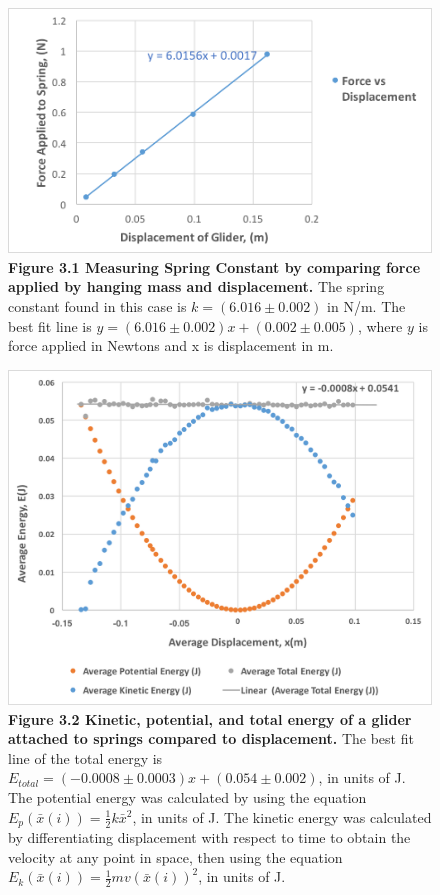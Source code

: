 \documentclass[11pt]{report}
\begin{document}
\begin{figure}[h!]
    \includegraphics[width=\linewidth]{SpringForce.png}
    \captionsetup{labelformat=empty}
    \caption{\textbf{Figure 3.1 Measuring Spring Constant by comparing force
    applied by hanging mass and displacement.} The spring constant found in this
case is \(k = (6.016 \pm 0.002)\) in N/m.  The best fit line is \(y = (6.016 \pm
0.002)x + (0.002 \pm 0.005)\), where \(y\) is force applied in Newtons and x is
displacement in m.}
\end{figure}

\begin{figure}[h!]
    \includegraphics[width=\linewidth]{Energy.png}
    \captionsetup[labelformat=empty]
    \caption{\textbf{Figure 3.2 Kinetic, potential, and total energy of a glider
    attached to springs compared to displacement.}  The best fit line of the
total energy is \(E_{total} = (-0.0008 \pm 0.0003)x + (0.054 \pm 0.002)\), in
units of J.  The potential energy was calculated by using
the equation \(E_p(\bar{x}(i)) = \frac{1}{2}k\bar{x}^2\), in units of J.
The kinetic energy was calculated by differentiating displacement
with respect to time to obtain the velocity at any point in space, then using
the equation \(E_k(\bar{x}(i)) = \frac{1}{2}mv(\bar{x}(i))^2\), in units of J. } 
\end{figure}
\end{document}
